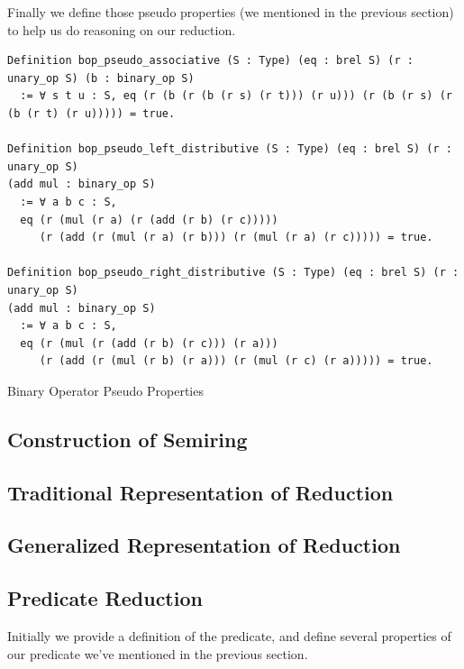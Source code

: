 \documentclass[a4paper,12pt,twoside,openright]{report}
\begin{document}
Finally we define those pseudo properties (we mentioned in the previous section) to help us do reasoning on our reduction.

\begin{listing}[H]
\begin{verbatim}
Definition bop_pseudo_associative (S : Type) (eq : brel S) (r : unary_op S) (b : binary_op S) 
  := ∀ s t u : S, eq (r (b (r (b (r s) (r t))) (r u))) (r (b (r s) (r (b (r t) (r u))))) = true.

Definition bop_pseudo_left_distributive (S : Type) (eq : brel S) (r : unary_op S) 
(add mul : binary_op S) 
  := ∀ a b c : S, 
  eq (r (mul (r a) (r (add (r b) (r c))))) 
     (r (add (r (mul (r a) (r b))) (r (mul (r a) (r c))))) = true. 
         
Definition bop_pseudo_right_distributive (S : Type) (eq : brel S) (r : unary_op S) 
(add mul : binary_op S) 
  := ∀ a b c : S, 
  eq (r (mul (r (add (r b) (r c))) (r a))) 
     (r (add (r (mul (r b) (r a))) (r (mul (r c) (r a))))) = true.

\end{verbatim}
\caption{Binary Operator Pseudo Properties} 
\label{coq:def:binary_properties_pseudo}
\end{listing}

\subsection{Construction of Semiring}
\subsection{Traditional Representation of Reduction}
\subsection{Generalized Representation of Reduction}

\subsection{Predicate Reduction}
Initially we provide a definition of the predicate, and define several properties of our predicate we've mentioned in the previous section.
\end{document}
